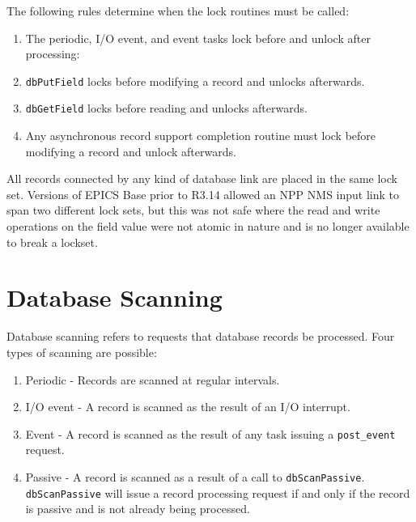 The following rules determine when the lock routines must be called:

\begin{enumerate}
\item The periodic, I/O event, and event tasks lock before and unlock after processing:

\item \verb|dbPutField| locks before modifying a record and unlocks afterwards.

\item \verb|dbGetField| locks before reading and unlocks afterwards.

\item Any asynchronous record support completion routine must lock before modifying a record and unlock afterwards.

\end{enumerate}

All records connected by any kind of database link are placed in the same lock set. Versions of EPICS Base prior to R3.14 
allowed an NPP NMS input link to span two different lock sets, but this was not safe where the read and write operations 
on the field value were not atomic in nature and is no longer available to break a lockset.

\section{Database Scanning}

Database scanning refers to requests that database records be processed. Four types of scanning are possible:

\begin{enumerate}
\item {}Periodic - Records are scanned at regular intervals.

\item {}I/O event - A record is scanned as the result of an I/O interrupt.

\item {}Event - A record is scanned as the result of any task issuing a \verb|post_event| request.

\item {}Passive - A record is scanned as a result of a call to \verb|dbScanPassive|. \verb|dbScanPassive| will issue a record 
processing request if and only if the record is passive and is not already being processed.

\end{enumerate}

